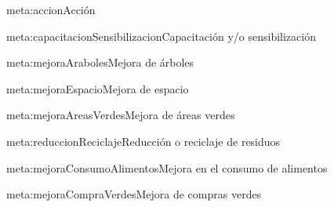 \begin{BusinessFact}{meta:accion}{Acción}
\end{BusinessFact}

\begin{BusinessFact}{meta:capacitacionSensibilizacion}{Capacitación y/o sensibilización}
\end{BusinessFact}

\begin{BusinessFact}{meta:mejoraAraboles}{Mejora de árboles}
\end{BusinessFact}

\begin{BusinessFact}{meta:mejoraEspacio}{Mejora de espacio}
\end{BusinessFact}

\begin{BusinessFact}{meta:mejoraAreasVerdes}{Mejora de áreas verdes}
\end{BusinessFact}

\begin{BusinessFact}{meta:reduccionReciclaje}{Reducción o reciclaje de residuos}
\end{BusinessFact}

\begin{BusinessFact}{meta:mejoraConsumoAlimentos}{Mejora en el consumo de alimentos}
\end{BusinessFact}

\begin{BusinessFact}{meta:mejoraCompraVerdes}{Mejora de compras verdes}
\end{BusinessFact}

